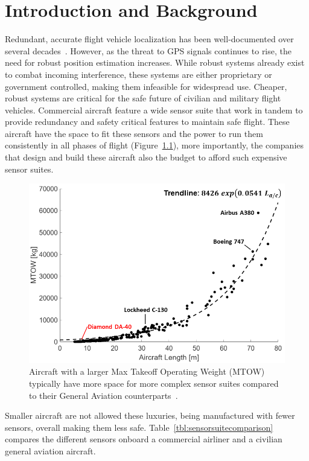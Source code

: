 \chapter{Introduction and Background}
Redundant, accurate flight vehicle localization has been well-documented over several decades~\cite{zhaoCooperativeLocalizationBased2017,rufaSensorFusionUnmanned2014,tennyRobustNavigationUrban2022,kandemirProbabilisticMeasurementMethod2018}. However, as the threat to GPS signals continues to rise, the need for robust position estimation increases. While robust systems already exist to combat incoming interference, these systems are either proprietary or government controlled, making them infeasible for widespread use. Cheaper, robust systems are critical for the safe future of civilian and military flight vehicles. Commercial aircraft feature a wide sensor suite that work in tandem to provide redundancy and safety critical features to maintain safe flight. These aircraft have the space to fit these sensors and the power to run them consistently in all phases of flight (Figure~\ref{fig:weights}), more importantly, the companies that design and build these aircraft also the budget to afford such expensive sensor suites.

\begin{figure}[!ht]\label{fig:weights}
    \centering
    \includegraphics[width=.6\linewidth]{Figures/weights.png}
    \caption{Aircraft with a larger Max Takeoff Operating Weight (MTOW) typically have more space for more complex sensor suites compared to their General Aviation counterparts~\cite{AircraftCharacteristicsDatabase}.}
\end{figure}

Smaller aircraft are not allowed these luxuries, being manufactured with fewer sensors, overall making them less safe. Table~\ref{tbl:sensorsuitecomparison} compares the different sensors onboard a commercial airliner and a civilian general aviation aircraft.

